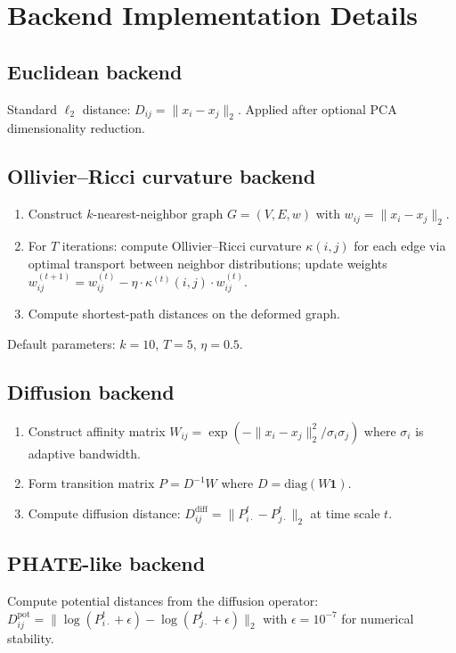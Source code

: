 \documentclass[11pt]{article}
\begin{document}
\section{Backend Implementation Details}
\label{sec:supp_backends}

\subsection{Euclidean backend}
Standard $\ell_2$ distance: $D_{ij} = \|x_i - x_j\|_2$.
Applied after optional PCA dimensionality reduction.

\subsection{Ollivier--Ricci curvature backend}
\begin{enumerate}
\item Construct $k$-nearest-neighbor graph $G = (V, E, w)$ with $w_{ij} = \|x_i - x_j\|_2$.
\item For $T$ iterations: compute Ollivier--Ricci curvature $\kappa(i,j)$ for each edge via optimal transport between neighbor distributions; update weights $w_{ij}^{(t+1)} = w_{ij}^{(t)} - \eta \cdot \kappa^{(t)}(i,j) \cdot w_{ij}^{(t)}$.
\item Compute shortest-path distances on the deformed graph.
\end{enumerate}
Default parameters: $k=10$, $T=5$, $\eta=0.5$.

\subsection{Diffusion backend}
\begin{enumerate}
\item Construct affinity matrix $W_{ij} = \exp(-\|x_i - x_j\|_2^2 / \sigma_i \sigma_j)$ where $\sigma_i$ is adaptive bandwidth.
\item Form transition matrix $P = D^{-1}W$ where $D = \text{diag}(W\mathbf{1})$.
\item Compute diffusion distance: $D_{ij}^{\text{diff}} = \|P^t_{i\cdot} - P^t_{j\cdot}\|_2$ at time scale $t$.
\end{enumerate}

\subsection{PHATE-like backend}
Compute potential distances from the diffusion operator:
$D_{ij}^{\text{pot}} = \|\log(P^t_{i\cdot} + \epsilon) - \log(P^t_{j\cdot} + \epsilon)\|_2$
with $\epsilon = 10^{-7}$ for numerical stability.
\end{document}
